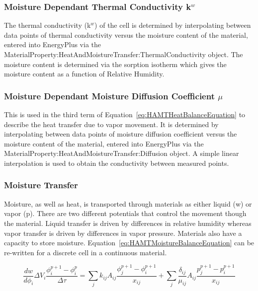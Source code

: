 \subsubsection{Moisture Dependant Thermal Conductivity k\(^{w}\)}\label{moisture-dependant-thermal-conductivity-kw}

The thermal conductivity (k\(^{w}\)) of the cell is determined by
interpolating between data points of thermal conductivity versus the
moisture content of the material, entered into EnergyPlus via the
MaterialProperty:HeatAndMoistureTransfer:ThermalConductivity object. The
moisture content is determined via the sorption isotherm which gives the
moisture content as a function of Relative Humidity.

\subsubsection{Moisture Dependant Moisture Diffusion Coefficient $\mu$}\label{moisture-dependant-moisture-diffusion-coefficient-ux3bc}

This is used in the third term of Equation~\ref{eq:HAMTHeatBalanceEquation}
to describe the heat transfer due to vapor movement. It is determined by
interpolating between data points of moisture diffusion coefficient versus
the moisture content of the material, entered into EnergyPlus via the
MaterialProperty:HeatAndMoistureTransfer:Diffusion object. A simple linear
interpolation is used to obtain the conductivity between measured points.

\subsubsection{Moisture Transfer}\label{moisture-transfer}

Moisture, as well as heat, is transported through materials as either
liquid (w) or vapor (p). There are two different potentials that control
the movement though the material. Liquid transfer is driven by differences
in relative humidity whereas vapor transfer is driven by differences in
vapor pressure. Materials also have a capacity to store moisture.
Equation~\ref{eq:HAMTMoistureBalanceEquation} can be re-written for a
discrete cell in a continuous material.

\begin{equation}
\frac{{dw}}{{d{\phi_i}}}\Delta {V_i}\frac{{\phi_i^{p + 1} - \phi_i^p}}{{\Delta \tau }} = \sum\limits_j {{k_{ij}}{A_{ij}}\frac{{\phi_j^{p + 1} - \phi_i^{p + 1}}}{{{x_{ij}}}}}  + \sum\limits_j {\frac{{{\delta_{ij}}}}{{{\mu_{ij}}}}{A_{ij}}\frac{{p_j^{p + 1} - p_i^{p + 1}}}{{{x_{ij}}}}}
\label{eq:HAMTMoistureBalanceEquationDiscreteCell}
\end{equation}

